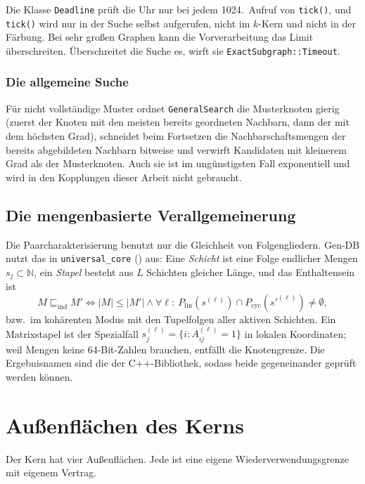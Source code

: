 \begin{bemerkung}[Zeitlimit]
	Die Klasse \texttt{Deadline} prüft die Uhr nur bei jedem 1024.\ Aufruf von \texttt{tick()}, und \texttt{tick()} wird nur in der Suche selbst aufgerufen, nicht im $k$-Kern und nicht in der Färbung. Bei sehr großen Graphen kann die Vorverarbeitung das Limit überschreiten. Überschreitet die Suche es, wirft sie \texttt{ExactSubgraph::Timeout}.
\end{bemerkung}

\subsection{Die allgemeine Suche}

Für nicht vollständige Muster ordnet \texttt{GeneralSearch} die Musterknoten gierig (zuerst der Knoten mit den meisten bereits geordneten Nachbarn, dann der mit dem höchsten Grad), schneidet beim Fortsetzen die Nachbarschaftsmengen der bereits abgebildeten Nachbarn bitweise und verwirft Kandidaten mit kleinerem Grad als der Musterknoten. Auch sie ist im ungünstigsten Fall exponentiell und wird in den Kopplungen dieser Arbeit nicht gebraucht.

\section{Die mengenbasierte Verallgemeinerung}
\label{sec:universal}

Die Paarcharakterisierung benutzt nur die Gleichheit von Folgengliedern. Gen-DB nutzt das in \texttt{universal\_core} () aus: Eine \emph{Schicht} ist eine Folge endlicher Mengen $s_j\subset\mathbb{N}$, ein \emph{Stapel} besteht aus $L$ Schichten gleicher Länge, und das Enthaltensein ist
\[
M\sqsubseteq_{\mathrm{ind}}M' \iff |M|\le|M'| \wedge \forall \ell:\ P_{\mathrm{lin}}(s^{(\ell)})\cap P_{\mathrm{cyc}}(s'^{(\ell)})\ne\emptyset,
\]
bzw.\ im kohärenten Modus mit den Tupelfolgen aller aktiven Schichten. Ein Matrixstapel ist der Spezialfall $s^{(\ell)}_j=\{i : A^{(\ell)}_{ij}=1\}$ in lokalen Koordinaten; weil Mengen keine 64-Bit-Zahlen brauchen, entfällt die Knotengrenze. Die Ergebnisnamen sind die der C++-Bibliothek, sodass beide gegeneinander geprüft werden können.

\chapter{Außenflächen des Kerns}
\label{chap:aussen}

Der Kern hat vier Außenflächen. Jede ist eine eigene Wiederverwendungsgrenze mit eigenem Vertrag.

